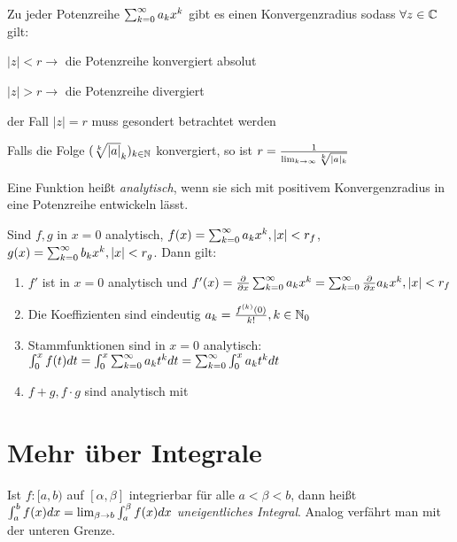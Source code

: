 \begin{satz}
	Zu jeder Potenzreihe $\sum_{k = 0}^{\infty} a_{k}x^k$ gibt es einen Konvergenzradius sodass $\forall z \in \mathbb{C}$ gilt:
	\begin{description}[noitemsep]
		\item $|z| < r \rightarrow $ die Potenzreihe konvergiert absolut
		\item $|z| > r \rightarrow $ die Potenzreihe divergiert
		\item der Fall $|z| = r$ muss gesondert betrachtet werden
	\end{description}
	Falls die Folge $(\sqrt[k]{|a|}_{k})_{k \in \mathbb{N}}$ konvergiert, so ist $r = \frac{1}{\lim_{k \rightarrow \infty}\sqrt[k]{|a|_k}}$
\end{satz}

\begin{definition}
	Eine Funktion heißt \emph{analytisch}, wenn sie sich mit positivem Konvergenzradius in eine Potenzreihe entwickeln lässt.
\end{definition}

\begin{satz}
	Sind $f,g$ in $x=0$ analytisch, $f(x) = \sum_{k = 0}^{\infty} a_{k}x^k, |x| < r_f$, $g(x) = \sum_{k = 0}^{\infty} b_{k}x^k, |x| < r_g$. Dann gilt:
	\begin{enumerate}[noitemsep]
		\item $f'$ ist in $x=0$ analytisch und $f'(x) = \frac{\partial}{\partial x} \sum_{k = 0}^{\infty} a_{k}x^k = \sum_{k=0}^{\infty} \frac{\partial}{\partial x}a_kx^k, |x| < r_f$
		\item Die Koeffizienten sind eindeutig $a_k = \frac{f^{(k)}(0)}{k!}, k \in \mathbb{N}_0$
		\item Stammfunktionen sind in $x=0$ analytisch: $\int_{0}^{x}f(t)dt = \int_{0}^{x}\sum_{k = 0}^{\infty} a_{k}t^k dt= \sum_{k=0}^{\infty}\int_{0}^{x}a_k t^k dt$
		\item $f + g, f \cdot g$ sind analytisch mit
	\end{enumerate}
\end{satz}

\pagebreak

\section{Mehr über Integrale}
\begin{definition}
	Ist $f : [a,b)$ auf $[\alpha, \beta]$ integrierbar für alle $a < \beta < b$, dann heißt $\int_{a}^{b} f(x) dx = \lim_{\beta \rightarrow b} \int_{a}^{\beta} f(x) dx$ \emph{uneigentliches Integral}. Analog verfährt man mit der unteren Grenze.
\end{definition}

